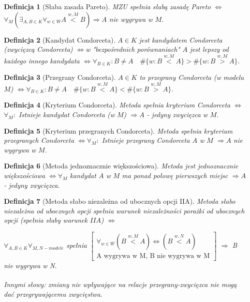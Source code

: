 \documentclass[12pt,a4paper]{article}
\theoremstyle{break}
\newtheorem{definition}{Definicja}[section]
\newcommand{\witw}{$\Leftrightarrow$}
\begin{document}
	\begin{definition}[Słaba zasada Pareto]
		MZU spełnia słabą zasadę Pareto \witw $\forall_M (\exists_{A,B\in K}\forall_{w\in W} A\overset{w,M}{<}B) \Rightarrow A$ nie wygrywa w $M$.
	\end{definition}
	
	\begin{definition}[Kandydat Condorceta]
		$A\in K$ jest kandydatem Condorceta (zwycięzcą Condorceta) \witw w "bezpośrednich porównaniach" $A$ jest lepszy od każdego innego kandydata \witw $\forall_{B \in K}: B\neq A \quad \#\{w: B\overset{w,M}{<}A\}>\#\{w: B\overset{w,M}{>}A\}$.
	\end{definition}

	\begin{definition}[Przegrany Condorceta]
		$A\in K$ to przegrany Condorceta (w modelu $M$) \witw $\forall_{B \in K}: B\neq A \quad\#\{w: B\overset{w,M}{<}A\}<\#\{w: B\overset{w,M}{>}A\}$.
	\end{definition}
	
	\begin{definition}[Kryterium Condorceta]
		Metoda spełnia kryterium Condorceta \witw $\forall_M:$ Istnieje kandydat Condorceta (w $M$) $\Rightarrow A$ - jedyny zwycięzca w $M$.
	\end{definition}
	
	\begin{definition}[Kryterium przegranych Condorceta]			
		Metoda spełnia kryterium przegranych Condorceta \witw $\forall_M:$ Istnieje przegrany Condorceta $A$ w $M$ $\Rightarrow A$ nie wygrywa w $M$.
	\end{definition}
	
	\begin{definition}[Metoda jednoznacznie większościowa]
		Metoda jest jednoznacznie większościowa \witw $\forall_M$ kandydat $A$ w $M$ ma ponad połowę pierwszych miejsc $\Rightarrow A$ - jedyny zwycięzca.
	\end{definition}
	
	\begin{definition}[Metoda słabo niezależna od ubocznych opcji IIA]
		Metoda słabo niezależna od ubocznych opcji spełnia warunek niezależności porażki od ubocznych opcji (spełnia słaby warunek $IIA$) \witw
		
		$\forall_{A,B\in K} \forall_{M,N - modele}$ spełnia 
		$\begin{bmatrix}
			\forall_{w\in W} (B\overset{w,M}{<}A) \text{\witw} (B\overset{w,N}{<}A) \\
			\text{A wygrywa w M, B nie wygrywa w M}		 
		\end{bmatrix}$	$\Rightarrow$ B nie wygrywa w N.\\\\
		
		Innymi słowy: zmiany nie wpływające na relacje przegrany-zwycięzca nie mogą dać przegrywającemu zwycięstwa.		
		
	\end{definition}
\end{document}

